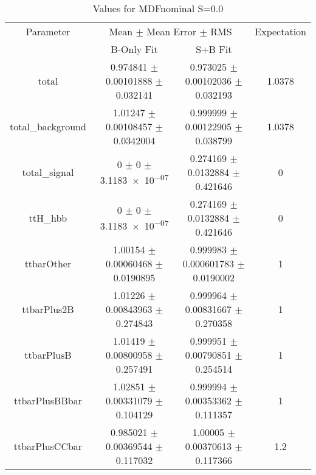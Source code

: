\begin{table}
\centering
\caption{Values for MDFnominal S=0.0}
\begin{tabular}{cccc}
\toprule
Parameter & \multicolumn{2}{c}{Mean $\pm$ Mean Error $\pm$ RMS} & Expectation\\
 & B-Only Fit & S+B Fit & \\
\midrule
total & \num{0.974841} $\pm$ \num{0.00101888} $\pm$ \num{0.032141} & \num{0.973025} $\pm$ \num{0.00102036} $\pm$ \num{0.032193} & \num{1.0378}\\
total\_background & \num{1.01247} $\pm$ \num{0.00108457} $\pm$ \num{0.0342004} & \num{0.999999} $\pm$ \num{0.00122905} $\pm$ \num{0.038799} & \num{1.0378}\\
total\_signal & \num{0} $\pm$ \num{0} $\pm$ \num{3.1183e-07} & \num{0.274169} $\pm$ \num{0.0132884} $\pm$ \num{0.421646} & \num{0}\\
ttH\_hbb & \num{0} $\pm$ \num{0} $\pm$ \num{3.1183e-07} & \num{0.274169} $\pm$ \num{0.0132884} $\pm$ \num{0.421646} & \num{0}\\
ttbarOther & \num{1.00154} $\pm$ \num{0.00060468} $\pm$ \num{0.0190895} & \num{0.999983} $\pm$ \num{0.000601783} $\pm$ \num{0.0190002} & \num{1}\\
ttbarPlus2B & \num{1.01226} $\pm$ \num{0.00843963} $\pm$ \num{0.274843} & \num{0.999964} $\pm$ \num{0.00831667} $\pm$ \num{0.270358} & \num{1}\\
ttbarPlusB & \num{1.01419} $\pm$ \num{0.00800958} $\pm$ \num{0.257491} & \num{0.999951} $\pm$ \num{0.00790851} $\pm$ \num{0.254514} & \num{1}\\
ttbarPlusBBbar & \num{1.02851} $\pm$ \num{0.00331079} $\pm$ \num{0.104129} & \num{0.999994} $\pm$ \num{0.00353362} $\pm$ \num{0.111357} & \num{1}\\
ttbarPlusCCbar & \num{0.985021} $\pm$ \num{0.00369544} $\pm$ \num{0.117032} & \num{1.00005} $\pm$ \num{0.00370613} $\pm$ \num{0.117366} & \num{1.2}\\
\bottomrule
\end{tabular}
\end{table}